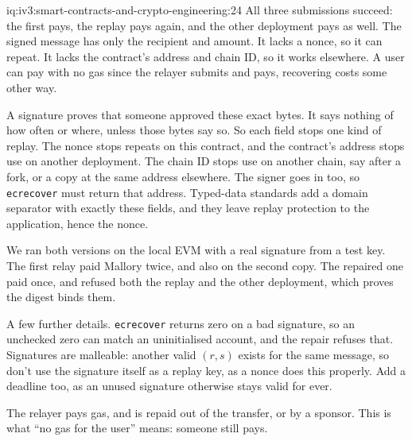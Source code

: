 \begin{solution}{iq:iv3:smart-contracts-and-crypto-engineering:24}
All three submissions succeed: the first pays, the replay pays again, and the other deployment pays as well. The signed message has only the recipient and amount. It lacks a nonce, so it can repeat. It lacks the contract's address and chain ID, so it works elsewhere. A user can pay with no gas since the relayer submits and pays, recovering costs some other way.
\label{lst:iv3:cr:saferelay}

A signature proves that someone approved these exact bytes. It says nothing of how often or where, unless those bytes say so. So each field stops one kind of replay. The nonce stops repeats on this contract, and the contract's address stops use on another deployment. The chain ID stops use on another chain, say after a fork, or a copy at the same address elsewhere. The signer goes in too, so \texttt{ecrecover} must return that address. Typed-data standards add a domain separator with exactly these fields, and they leave replay protection to the application, hence the nonce.

We ran both versions on the local EVM with a real signature from a test key. The first relay paid Mallory twice, and also on the second copy. The repaired one paid once, and refused both the replay and the other deployment, which proves the digest binds them.

A few further details. \texttt{ecrecover} returns zero on a bad signature, so an unchecked zero can match an uninitialised account, and the repair refuses that. Signatures are malleable: another valid $(r, s)$ exists for the same message, so don't use the signature itself as a replay key, as a nonce does this properly. Add a deadline too, as an unused signature otherwise stays valid for ever.

The relayer pays gas, and is repaid out of the transfer, or by a sponsor. This is what ``no gas for the user'' means: someone still pays.

\end{solution}

